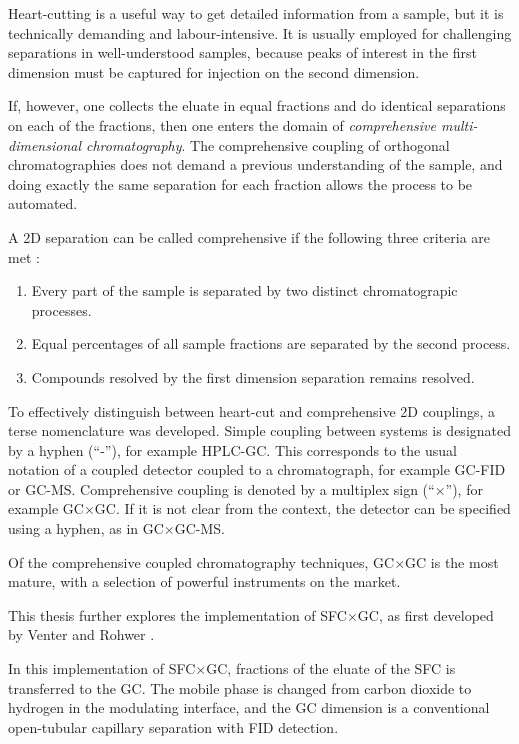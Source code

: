 Heart-cutting is a useful way to get detailed information from a sample, but it
is technically demanding and labour-intensive. It is usually employed for
challenging separations in well-understood samples, because peaks of interest
in the first dimension must be captured for injection on the second dimension.

If, however, one collects the eluate in equal fractions and do identical
separations on each of the fractions, then one enters the domain of
\textit{comprehensive multi-dimensional chromatography}. The comprehensive
coupling of orthogonal chromatographies does not demand a previous understanding
of the sample, and doing exactly the same separation for each fraction allows
the process to be automated.

A 2D separation can be called comprehensive if the following three criteria are
met \autocite{Giddings1987}:

\begin{enumerate}
  \item Every part of the sample is separated by two distinct chromatograpic processes.
  \item Equal percentages of all sample fractions are separated by the second process.	 
  \item Compounds resolved by the first dimension separation remains resolved.  
\end{enumerate} 

To effectively distinguish between heart-cut and comprehensive 2D couplings, a
terse nomenclature was developed. Simple coupling between systems is
designated by a hyphen (``-''), for example HPLC-GC. This corresponds to the
usual notation of a coupled detector coupled to a chromatograph, for example
GC-FID or GC-MS. Comprehensive coupling is denoted by a multiplex sign
(``$\times$''), for example GC$\times$GC. If it is not clear from the context,
the detector can be specified using a hyphen, as in GC$\times$GC-MS.

Of the comprehensive coupled chromatography techniques, GC$\times$GC is the most
mature, with a selection of powerful instruments on the market.

This thesis further explores the implementation of SFC$\times$GC, as first
developed by Venter and Rohwer \autocite{Venter2004, Venter2006}.

In this implementation of SFC$\times$GC, fractions of the eluate of the SFC is
transferred to the GC. The mobile phase is changed from carbon dioxide to
hydrogen in the modulating interface, and the GC dimension is a conventional open-tubular
capillary separation with FID detection.

